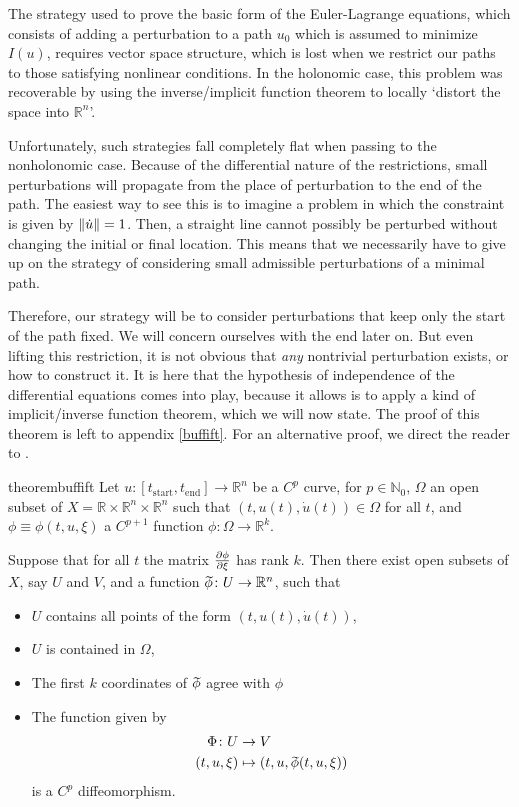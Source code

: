 \documentclass{article}
\theoremstyle{plain}
\theoremstyle{plain}
\theoremstyle{nonumberplain}
\theoremstyle{empty}
\newcommand{\R}{\mathbb{R}}
\newcommand{\N}{\mathbb{N}}
\newcommand{\tstart}{\mathrm{start}}
\newcommand{\tend}{\mathrm{end}}
\newcommand{\wtphi}{
  \mspace{2mu}
  \widetilde{\mspace{-2mu}\smash[t]{\phi}}
}
\DeclarePairedDelimiter\norm{\lVert}{\rVert}
\begin{document}
The strategy used to prove the basic form of the Euler-Lagrange equations, which consists of adding a perturbation to a path $u_0$ which is assumed to minimize $I(u)$, requires vector space structure, which is lost when we restrict our paths to those satisfying nonlinear conditions. In the holonomic case, this problem was recoverable by using the inverse/implicit function theorem to locally `distort the space into $\R^n$'.

Unfortunately, such strategies fall completely flat when passing to the nonholonomic case. Because of the differential nature of the restrictions, small perturbations will propagate from the place of perturbation to the end of the path. The easiest way to see this is to imagine a problem in which the constraint is given by $\norm{\dot u} = 1$. Then, a straight line cannot possibly be perturbed without changing the initial or final location. This means that we necessarily have to give up on the strategy of considering small admissible perturbations of a minimal path.

Therefore, our strategy will be to consider perturbations that keep only the start of the path fixed. We will concern ourselves with the end later on. But even lifting this restriction, it is not obvious that \emph{any} nontrivial perturbation exists, or how to construct it. It is here that the hypothesis of independence of the differential equations comes into play, because it allows is to apply a kind of implicit/inverse function theorem, which we will now state. The proof of this theorem is left to appendix \ref{buffift}. For an alternative proof, we direct the reader to \cite[\S 3]{blissmayer}.

\begin{restatable}{theorem}{buffift}\label{thm:buffift}
Let $u \colon [t_\tstart,t_\tend] \to \R^n$ be a $C^p$ curve, for $p \in \N_0$, $\Omega$ an open subset of $X = \R \times \R^n \times \R^n$ such that $(t,u(t),\dot u(t)) \in \Omega$ for all $t$, and $\phi \equiv \phi(t,u,\xi)$ a $C^{p+1}$ function $\phi \colon \Omega \to \R^k$.

Suppose that for all $t$ the matrix $\diffp\phi\xi$ has rank $k$. Then there exist open subsets of $X$, say $U$ and $V$, and a function $\wtphi \colon U \to \R^n$, such that
\begin{itemize}
\item $U$ contains all points of the form $(t,u(t),\dot u(t))$,
\item $U$ is contained in $\Omega$,
\item The first $k$ coordinates of $\wtphi$ agree with $\phi$
\item The function given by
\begin{align*}
\Phi \colon U &\to V\\
(t,u,\xi) &\mapsto (t,u,\wtphi(t,u,\xi))
\end{align*}
is a $C^p$ diffeomorphism.
\end{itemize}
\end{restatable}
\end{document}
